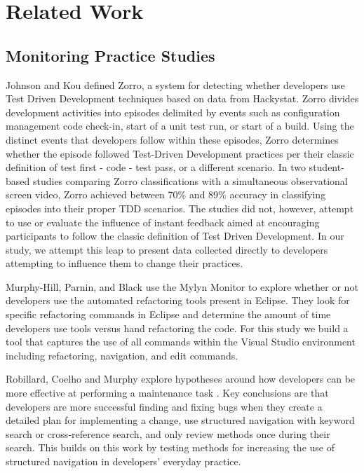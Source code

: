 \documentclass{sig-alternate}
\begin{document}
\section{Related Work}
\subsection{Monitoring Practice Studies }
Johnson and Kou defined Zorro\cite{V:Johnson2007Automated}, a system for detecting whether developers use Test Driven Development techniques based on data from Hackystat.  Zorro divides development activities into episodes delimited by events such as configuration management code check-in, start of a unit test run, or start of a build.  Using the distinct events that developers follow within these episodes, Zorro determines whether the episode followed Test-Driven Development practices per their classic definition of test first - code - test pass, or a different scenario.  In two student-based studies comparing Zorro classifications with a simultaneous observational screen video, Zorro achieved between 70\% \cite{Kou2010Operational} and 89\% \cite{V:Johnson2007Automated} accuracy in classifying episodes into their proper TDD scenarios.  The studies did not, however, attempt to use or evaluate the influence of instant feedback aimed at encouraging participants to follow the classic definition of Test Driven Development.  In our study, we attempt this leap to present data collected directly to developers attempting to influence them to change their practices.

Murphy-Hill, Parnin, and Black \cite{V:MurphyHill2012How} use the Mylyn Monitor to explore whether or not developers use the automated refactoring tools present in Eclipse.  They look for specific refactoring commands in Eclipse and determine the amount of time developers use tools versus hand refactoring the code.  For this study we build a tool that captures the use of all commands within the Visual Studio environment including refactoring, navigation, and edit commands.

Robillard, Coelho and Murphy explore hypotheses around how developers can be more effective at performing a maintenance task \cite{wbsnipes:Robillard2004How}.  Key conclusions are that developers are more successful finding and fixing bugs when they create a detailed plan for implementing a change, use structured navigation with keyword search or cross-reference search, and only review methods once during their search.  This builds on this work by testing methods for increasing the use of structured navigation in developers' everyday practice.
\end{document}
